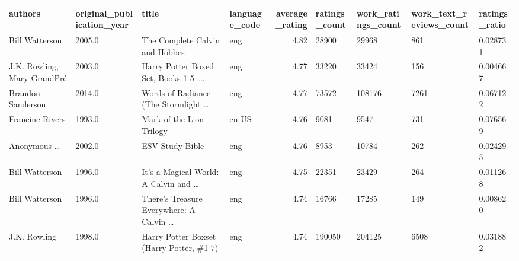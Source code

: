 \documentclass[11pt]{article}
\begin{document}
\begin{table}
\begin{tabular}{lHlHrHHHZ}
\toprule
                                    authors &  original\_publication\_year &                                              title & language\_code &  average\_rating &  ratings\_count &  work\_ratings\_count &  work\_text\_reviews\_count &  ratings\_ratio \\
\midrule
                             Bill Watterson &                     2005.0 &                     The Complete Calvin and Hobbes &           eng &            4.82 &          28900 &               29968 &                      861 &       0.028731 \\
                J.K. Rowling, Mary GrandPr\'e &                     2003.0 &  Harry Potter Boxed Set, Books 1-5 \ldots. &           eng &            4.77 &          33220 &               33424 &                      156 &       0.004667 \\
                          Brandon Sanderson &                     2014.0 &     Words of Radiance (The Stormlight \ldots &           eng &            4.77 &          73572 &              108176 &                     7261 &       0.067122 \\
                            Francine Rivers &                     1993.0 &                           Mark of the Lion Trilogy &         en-US &            4.76 &           9081 &                9547 &                      731 &       0.076569 \\
 Anonymous \ldots &                     2002.0 &                                    ESV Study Bible &           eng &            4.76 &           8953 &               10784 &                      262 &       0.024295 \\
                             Bill Watterson &                     1996.0 &  It's a Magical World: A Calvin and \ldots &           eng &            4.75 &          22351 &               23429 &                      264 &       0.011268 \\
                             Bill Watterson &                     1996.0 &  There's Treasure Everywhere: A Calvin \ldots &           eng &            4.74 &          16766 &               17285 &                      149 &       0.008620 \\
                               J.K. Rowling &                     1998.0 &           Harry Potter Boxset (Harry Potter, \#1-7) &           eng &            4.74 &         190050 &              204125 &                     6508 &       0.031882 \\

\end{tabular}
\end{table}
\end{document}
